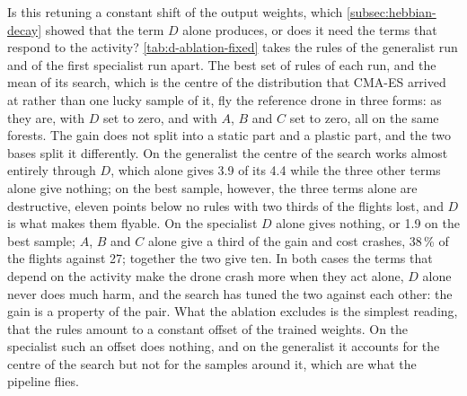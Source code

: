 Is this retuning a constant shift of the output weights, which \autoref{subsec:hebbian-decay} showed that the term $D$ alone produces, or does it need the terms that respond to the activity? \autoref{tab:d-ablation-fixed} takes the rules of the generalist run and of the first specialist run apart. The best set of rules of each run, and the mean of its search, which is the centre of the distribution that CMA-ES arrived at rather than one lucky sample of it, fly the reference drone in three forms: as they are, with $D$ set to zero, and with $A$, $B$ and $C$ set to zero, all on the same forests. The gain does not split into a static part and a plastic part, and the two bases split it differently. On the generalist the centre of the search works almost entirely through $D$, which alone gives 3.9 of its 4.4 while the three other terms alone give nothing; on the best sample, however, the three terms alone are destructive, eleven points below no rules with two thirds of the flights lost, and $D$ is what makes them flyable. On the specialist $D$ alone gives nothing, or 1.9 on the best sample; $A$, $B$ and $C$ alone give a third of the gain and cost crashes, 38\,\% of the flights against 27; together the two give ten. In both cases the terms that depend on the activity make the drone crash more when they act alone, $D$ alone never does much harm, and the search has tuned the two against each other: the gain is a property of the pair. What the ablation excludes is the simplest reading, that the rules amount to a constant offset of the trained weights. On the specialist such an offset does nothing, and on the generalist it accounts for the centre of the search but not for the samples around it, which are what the pipeline flies.

